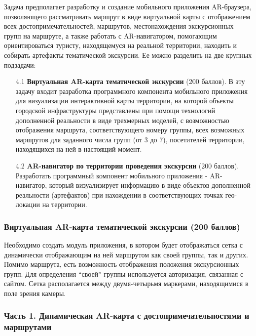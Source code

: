 
Задача предполагает разработку и создание мобильного приложения AR-браузера, позволяющего рассматривать маршрут в виде виртуальной карты с отображением всех достопримечательностей, маршрутов, местонахождения экскурсионных групп на маршруте, а также работать с AR-навигатором, помогающим ориентироваться туристу, находящемуся на реальной территории, находить и собирать артефакты тематической экскурсии. Ее можно разделить на две крупных подзадачи: 
\begin{enumerate}
    \item[4.1] \textbf{Виртуальная AR-карта тематической экскурсии} (200 баллов). В эту задачу входит разработка программного компонента мобильного приложения для визуализации интерактивной карты территории, на которой объекты городской инфраструктуры представлены при помощи технологий дополненной реальности в виде трехмерных моделей, с возможностью отображения маршрута, соответствующего номеру группы, всех возможных маршрутов для заданного числа групп (от 3 до 7), посетителей территории, находящихся на ней в настоящий момент.
    \item[4.2] \textbf{AR-навигатор по территории проведения экскурсии} (200 баллов). Разработать программный компонент мобильного приложения - AR-навигатор, который визуализирует информацию в виде объектов дополненной реальности (артефактов) при нахождении в соответствующих точках гео-локации на территории.
\end{enumerate}

\subsubsection*{Виртуальная AR-карта тематической экскурсии (200 баллов)}

Необходимо создать модуль приложения, в котором будет отображаться сетка с динамически отображающим на ней маршрутом как своей группы, так и других. Помимо маршрута, есть возможность отображения положения экскурсионных групп. Для определения “своей” группы используется авторизация, связанная с сайтом. Сетка располагается между двумя-четырьмя маркерами, находящимися в поле зрения камеры.

\subsubsection*{Часть 1. Динамическая AR-карта с достопримечательностями и маршрутами}

